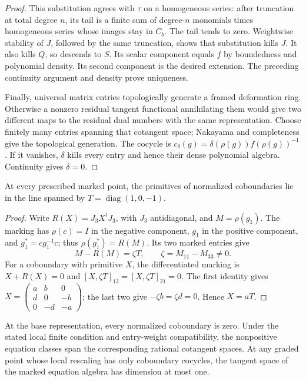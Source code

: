 \begin{proof}
This substitution agrees with \(\tau\) on a homogeneous series:
after truncation at total degree \(n\), its tail is a finite sum
of degree-\(n\) monomials times homogeneous series whose images
stay in \(C_b\). The tail tends to zero. Weightwise stability
of \(J\), followed by the same truncation, shows that substitution
kills \(J\). It also kills \(Q\), so descends to \(S\).
Its scalar component equals \(f\) by boundedness and polynomial
density. Its second component is the desired extension. The preceding
continuity argument and density prove uniqueness.

Finally, universal matrix entries topologically generate a framed
deformation ring. Otherwise a nonzero residual tangent functional
annihilating them would give two different maps to the residual dual
numbers with the same representation. Choose finitely many entries
spanning that cotangent space; Nakayama and completeness give the
topological generation. The cocycle is
\(c_\delta(g)=\delta(\rho(g))f(\rho(g))^{-1}\).
If it vanishes, \(\delta\) kills every entry and hence their dense
polynomial algebra. Continuity gives \(\delta=0\).
\end{proof}

\begin{lemma}\label{lem:selmer-normalized-coboundary}
At every prescribed marked point, the primitives of normalized
coboundaries lie in the line spanned by
\(T=\operatorname{diag}(1,0,-1)\).
\end{lemma}

\begin{proof}
Write \(R(X)=J_3X^tJ_3\), with \(J_3\) antidiagonal, and
\(M=\rho(g_1)\). The marking has \(\rho(c)=I\) in the
negative component, \(g_1\) in the positive component, and
\(g_1^*=cg_1^{-1}c\); thus \(\rho(g_1^*)=R(M)\).
Its two marked entries give
\[
 M-R(M)=\zeta T,\qquad \zeta=M_{11}-M_{33}\ne0.
\]
For a coboundary with primitive \(X\), the differentiated marking is
\(X+R(X)=0\) and \([X,\zeta T]_{12}=[X,\zeta T]_{21}=0\).
The first identity gives
\(X=\left(\begin{smallmatrix}a&b&0\\d&0&-b\\0&-d&-a\end{smallmatrix}\right)\);
the last two give \(-\zeta b=\zeta d=0\). Hence \(X=aT\).
\end{proof}

\begin{corollary}\label{lem:selmer-normalized-base-coboundary}
At the base representation, every normalized coboundary is zero.
Under the stated local finite condition and entry-weight compatibility, the nonpositive equation
classes span the corresponding rational cotangent spaces. At any
graded point whose local rescaling has only coboundary cocycles, the tangent
space of the marked equation algebra has dimension at most one.
\end{corollary}

